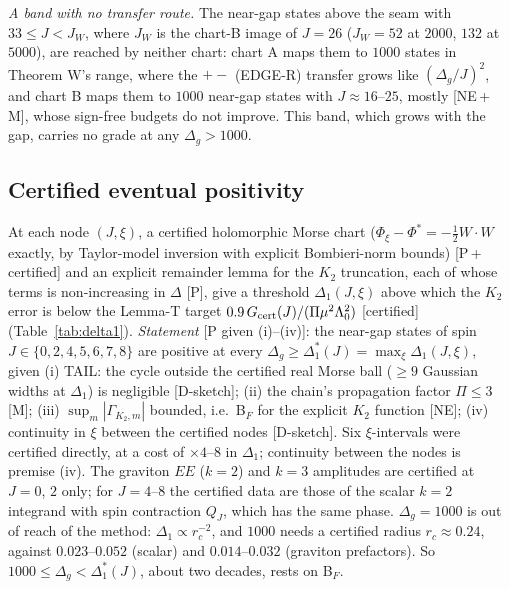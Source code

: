 \documentclass[aps,prl,onecolumn,superscriptaddress,nofootinbib]{revtex4-2}
\begin{document}
\emph{A band with no transfer route.} The near-gap states above the seam with $33\le J<J_W$, where $J_W$ is the chart-B image of $J=26$ ($J_W=52$ at $2000$,
$132$ at $5000$), are reached by neither chart: chart A maps them to $1000$ states in Theorem W's range, where the $+-$
(EDGE-R) transfer grows like $(\Delta_g/J)^2$, and chart B maps them to $1000$ near-gap states with $J\approx16$--$25$, mostly
[NE\,+\,M], whose sign-free budgets do not improve. This band,
which grows with the gap, carries no grade at any $\Delta_g>1000$.

\subsection{Certified eventual positivity}
At each node $(J,\xi)$, a certified holomorphic Morse chart ($\Phi_\xi-\Phi^*=-\tfrac12W\cdot W$ exactly, by Taylor-model inversion
with explicit Bombieri-norm bounds) [P\,+\,certified] and an explicit remainder lemma for the $K_2$ truncation, each of whose terms
is non-increasing in $\Delta$ [P], give a threshold $\Delta_1(J,\xi)$ above which the $K_2$ error is below the Lemma-T target
$0.9\,G_{\rm cert}(J)/(\Pi\mu^2\Lambda_0^2)$ [certified] (Table~\ref{tab:delta1}). \emph{Statement} [P given (i)--(iv)]: the near-gap
states of spin $J\in\{0,2,4,5,6,7,8\}$ are positive at every $\Delta_g\ge\Delta_1^*(J)=\max_\xi\Delta_1(J,\xi)$, given (i) TAIL: the
cycle outside the certified real Morse ball ($\ge9$ Gaussian widths at $\Delta_1$) is negligible [D-sketch]; (ii) the chain's
propagation factor $\Pi\le3$ [M]; (iii) $\sup_m|\Gamma_{K_2,m}|$ bounded, i.e.\ B$_F$ for the explicit $K_2$ function [NE];
(iv) continuity in $\xi$ between the certified nodes [D-sketch]. Six $\xi$-intervals were certified directly, at a cost of $\times4$--$8$
in $\Delta_1$; continuity between the nodes is premise (iv). The graviton $EE$ ($k=2$) and $k=3$ amplitudes are
certified at $J=0$, $2$ only; for $J=4$--$8$ the certified data are those of the scalar $k=2$ integrand with spin contraction $Q_J$,
which has the same phase. $\Delta_g=1000$ is out of reach of the method: $\Delta_1\propto r_c^{-2}$, and $1000$ needs a certified radius
$r_c\approx0.24$, against $0.023$--$0.052$ (scalar) and $0.014$--$0.032$ (graviton prefactors). So $1000\le\Delta_g<\Delta_1^*(J)$, about two decades, rests on B$_F$.
\end{document}
